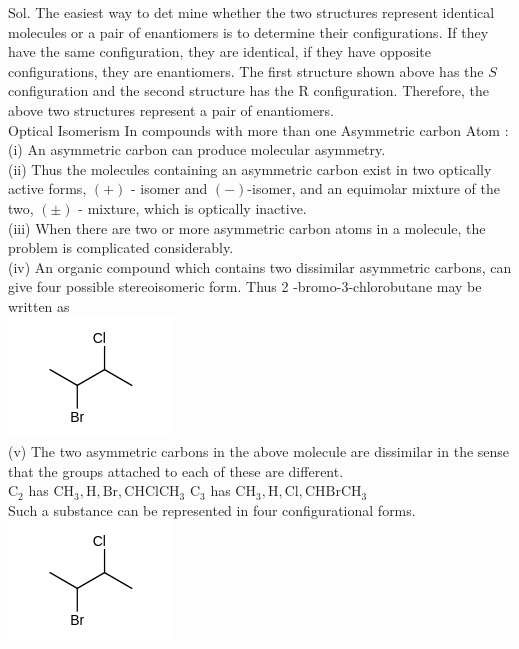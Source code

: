 \documentclass[10pt]{article}
\begin{document}
Sol. The easiest way to det mine whether the two structures represent identical molecules or a pair of enantiomers is to determine their configurations. If they have the same configuration, they are identical, if they have opposite configurations, they are enantiomers. The first structure shown above has the $S$ configuration and the second structure has the R configuration. Therefore, the above two structures represent a pair of enantiomers.\\
Optical Isomerism In compounds with more than one Asymmetric carbon Atom :\\
(i) An asymmetric carbon can produce molecular asymmetry.\\
(ii) Thus the molecules containing an asymmetric carbon exist in two optically active forms, $(+)$ - isomer and $(-)$-isomer, and an equimolar mixture of the two, $( \pm)$ - mixture, which is optically inactive.\\
(iii) When there are two or more asymmetric carbon atoms in a molecule, the problem is complicated considerably.\\
(iv) An organic compound which contains two dissimilar asymmetric carbons, can give four possible stereoisomeric form. Thus 2 -bromo-3-chlorobutane may be written as\\
\includegraphics{smile-3fff19ec5b142da00a1291da9b4f39769e8c1283}\\
(v) The two asymmetric carbons in the above molecule are dissimilar in the sense that the groups attached to each of these are different.\\
$\mathrm{C}_{2}$ has $\mathrm{CH}_{3}, \mathrm{H}, \mathrm{Br}, \mathrm{CHClCH}_{3}$ $\mathrm{C}_{3}$ has $\mathrm{CH}_{3}, \mathrm{H}, \mathrm{Cl}, \mathrm{CHBrCH}_{3}$\\
Such a substance can be represented in four configurational forms.\\
\includegraphics{smile-10d5b757ce737db9b89eb6bee88e0f4c89e4d7a4}\\
\end{document}
